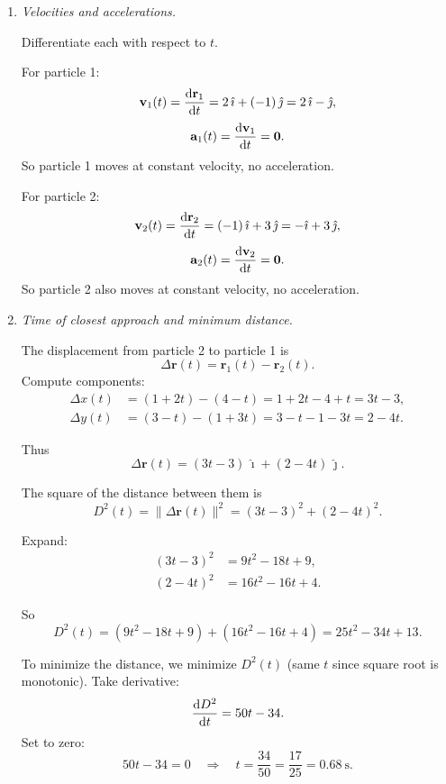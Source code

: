 \documentclass[12pt]{article}
\begin{document}
\begin{enumerate}
\begin{enumerate}
    \item \textit{Velocities and accelerations.}

    Differentiate each with respect to $t$.

    For particle 1:
    \[
    \mathbf{v}_1(t)
    = \dv{\mathbf{r}_1}{t}
    = 2\,\hat{\imath} + (-1)\,\hat{\jmath}
    = 2\,\hat{\imath} - \hat{\jmath},
    \]
    \[
    \mathbf{a}_1(t)
    = \dv{\mathbf{v}_1}{t}
    = \mathbf{0}.
    \]
    So particle 1 moves at constant velocity, no acceleration.

    For particle 2:
    \[
    \mathbf{v}_2(t)
    = \dv{\mathbf{r}_2}{t}
    = (-1)\,\hat{\imath} + 3\,\hat{\jmath}
    = -\hat{\imath} + 3\,\hat{\jmath},
    \]
    \[
    \mathbf{a}_2(t)
    = \dv{\mathbf{v}_2}{t}
    = \mathbf{0}.
    \]
    So particle 2 also moves at constant velocity, no acceleration.

    \item \textit{Time of closest approach and minimum distance.}

    The displacement from particle 2 to particle 1 is
    \[
    \Delta \mathbf{r}(t)
    = \mathbf{r}_1(t) - \mathbf{r}_2(t).
    \]
    Compute components:
    \begin{align*}
    \Delta x(t)
    &= (1+2t) - (4-t)
    = 1+2t-4+t
    = 3t - 3,
    \\
    \Delta y(t)
    &= (3-t) - (1+3t)
    = 3-t-1-3t
    = 2 - 4t.
    \end{align*}

    Thus
    \[
    \Delta \mathbf{r}(t)
    = (3t-3)\,\hat{\imath} + (2-4t)\,\hat{\jmath}.
    \]

    The square of the distance between them is
    \[
    D^2(t)
    = \|\Delta \mathbf{r}(t)\|^2
    = (3t-3)^2 + (2-4t)^2.
    \]

    Expand:
    \begin{align*}
    (3t-3)^2 &= 9t^2 -18t +9, \\
    (2-4t)^2 &= 16t^2 -16t +4.
    \end{align*}

    So
    \[
    D^2(t)
    = (9t^2 -18t +9) + (16t^2 -16t +4)
    = 25t^2 -34t +13.
    \]

    To minimize the distance, we minimize $D^2(t)$ (same $t$ since square root is monotonic). Take derivative:
    \[
    \dv{D^2}{t} = 50t - 34.
    \]
    Set to zero:
    \[
    50t - 34 = 0
    \quad\Rightarrow\quad
    t = \frac{34}{50} = \frac{17}{25} = 0.68~\text{s}.
    \]


\end{enumerate}
\end{enumerate}
\end{document}
